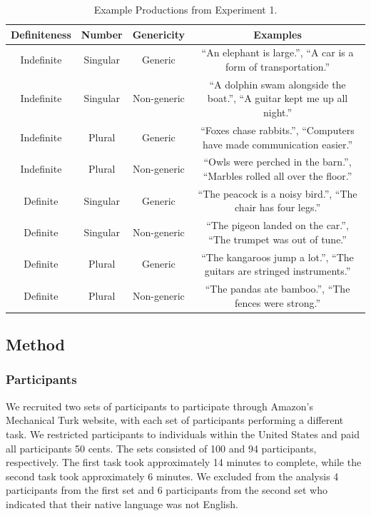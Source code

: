 \documentclass[10pt,letterpaper]{article}
\begin{document}
\begin{table}
\begin{center}
\caption{Example Productions from Experiment 1.}
\label{tab:ex}
\vskip 0.12in
\begin{tabular}{cccc}
\hline
Definiteness    &  Number & Genericity & Examples \\
\hline
Indefinite        &   Singular & Generic & ``An elephant is large.'', ``A car is a form of transportation.''\\
Indefinite  &   Singular & Non-generic & ``A dolphin swam alongside the boat.'', ``A guitar kept me up all night.''\\
Indefinite           &   Plural & Generic & ``Foxes chase rabbits.'', ``Computers have made communication easier.''\\
Indefinite         &   Plural  & Non-generic & ``Owls were perched in the barn.'', ``Marbles rolled all over the floor.''\\
Definite        &   Singular & Generic & ``The peacock is a noisy bird.'', ``The chair has four legs.''  \\
Definite  &   Singular & Non-generic & ``The pigeon landed on the car.'', ``The trumpet was out of tune.''\\
Definite           &   Plural & Generic & ``The kangaroos jump a lot.'', ``The guitars are stringed instruments.'' \\
Definite         &   Plural & Non-generic & ``The pandas ate bamboo.'', ``The fences were strong.''\\
\hline
\end{tabular}
\end{center}
\end{table}

\subsection{Method}

\subsubsection{Participants}

We recruited two sets of participants to participate through Amazon's Mechanical Turk website, with each set of participants performing a different task. We restricted participants to individuals within the United States and paid all participants 50 cents. The sets consisted of 100 and 94 participants, respectively. The first task took approximately 14 minutes to complete, while the second task took approximately 6 minutes. We excluded from the analysis 4 participants from the first set and 6 participants from the second set who indicated that their native language was not English.
\end{document}
